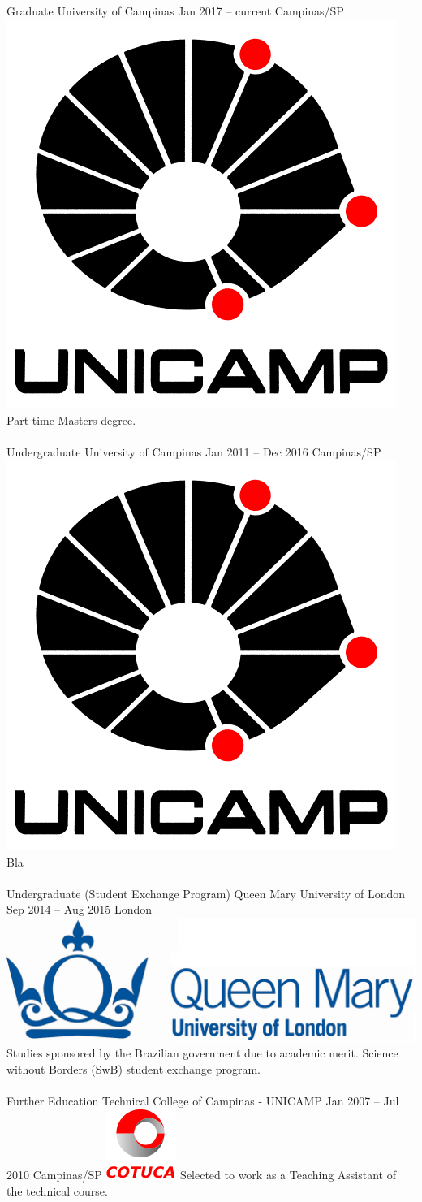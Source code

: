 \documentclass[
	a4paper,
]{fortysecondscv}
\newcommand{\profiledivider}{\textcolor{body!30}{\hdashrule{\linewidth}{0.6pt}{0.5ex}}\\}
\begin{document}
\makefrontsidebar

\graphicspath{{../figures/education/}}
    \cvevent
        {Graduate}
        {University of Campinas}
        {Jan 2017 -- current}
        {Campinas/SP}
        {\hspace{2mm}\includegraphics[height=0.07\textwidth]{Unicamp}}
        {Part-time Masters degree.}
    \\\profiledivider
	\cvevent
        {Undergraduate}
        {University of Campinas}
        {Jan 2011 -- Dec 2016}
        {Campinas/SP}
        {\hspace{2mm}\includegraphics[height=0.07\textwidth]{Unicamp}}
        {Bla}
    \\\profiledivider
    \cvevent
        {Undergraduate (Student Exchange Program)}
        {Queen Mary University of London}
        {Sep 2014 -- Aug 2015}
        {London}
        {\hspace{2mm}\includegraphics[height=0.07\textwidth]{QMUL}}
        {Studies sponsored by the Brazilian government due to academic merit. Science without Borders (SwB) student exchange program.}
    \\\profiledivider
	\cvevent
        {Further Education}
        {Technical College of Campinas - UNICAMP}
        {Jan 2007 -- Jul 2010}
        {Campinas/SP}
        {\hspace{2mm}\includegraphics[height=0.07\textwidth]{Cotuca}}
        {Selected to work as a Teaching Assistant of the technical course.}
\end{document}
